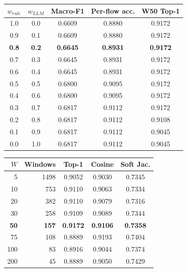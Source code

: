 \begin{tabular}{ccccc}
\toprule
$w_{rule}$ & $w_{LLM}$ & Macro-F1 & Per-flow acc. & W50 Top-1 \\
\midrule
1.0 & 0.0 & 0.6609 & 0.8880 & 0.9172 \\
0.9 & 0.1 & 0.6609 & 0.8880 & 0.9172 \\
\textbf{0.8} & \textbf{0.2} & \textbf{0.6645} & \textbf{0.8931} & \textbf{0.9172} \\
0.7 & 0.3 & 0.6645 & 0.8931 & 0.9172 \\
0.6 & 0.4 & 0.6645 & 0.8931 & 0.9172 \\
0.5 & 0.5 & 0.6800 & 0.9095 & 0.9172 \\
0.4 & 0.6 & 0.6800 & 0.9095 & 0.9172 \\
0.3 & 0.7 & 0.6817 & 0.9112 & 0.9172 \\
0.2 & 0.8 & 0.6817 & 0.9112 & 0.9108 \\
0.1 & 0.9 & 0.6817 & 0.9112 & 0.9045 \\
0.0 & 1.0 & 0.6817 & 0.9112 & 0.9045 \\
\bottomrule
\end{tabular}

\begin{tabular}{rrccc}
\toprule
$W$ & Windows & Top-1 & Cosine & Soft Jac. \\
\midrule
5 & 1498 & 0.9052 & 0.9030 & 0.7345 \\
10 & 753 & 0.9110 & 0.9063 & 0.7334 \\
20 & 382 & 0.9110 & 0.9079 & 0.7316 \\
30 & 258 & 0.9109 & 0.9089 & 0.7344 \\
\textbf{50} & \textbf{157} & \textbf{0.9172} & \textbf{0.9106} & \textbf{0.7358} \\
75 & 108 & 0.8889 & 0.9193 & 0.7404 \\
100 & 83 & 0.8916 & 0.9044 & 0.7374 \\
200 & 45 & 0.8889 & 0.9050 & 0.7429 \\
\bottomrule
\end{tabular}
